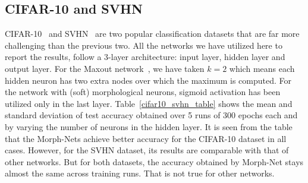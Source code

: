 \documentclass{bmvc2k}
\begin{document}
\subsection{CIFAR-10 and SVHN}
CIFAR-10~\cite{krizhevsky_learning_2009} and SVHN~\cite{netzer2011reading} are two popular classification datasets that are far more challenging than the previous two. All the networks we have utilized here to report the results, follow a 3-layer architecture: input layer, hidden layer and output layer. For the Maxout network~\cite{goodfellow_maxout_2013}, we have taken $k=2$ which means each hidden neuron has two extra nodes over which the maximum is computed. For the network with (soft) morphological neurons, sigmoid activation has been utilized only in the last layer. Table~\ref{cifar10_svhn_table} shows the mean and standard deviation of test accuracy obtained over 5 runs of 300 epochs each and by varying the number of neurons in the hidden layer. It is seen from the table that the Morph-Nets achieve better accuracy for the CIFAR-10 dataset in all cases. However, for the SVHN dataset, its results are comparable with that of other networks. But for both datasets, the accuracy obtained by Morph-Net stays almost the same across training runs. That is not true for other networks.
\end{document}
